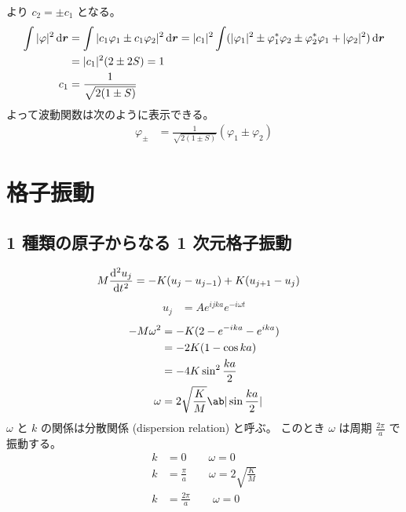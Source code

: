 \documentclass[uplatex,dvipdfmx,a4paper,11pt]{jlreq}
\begin{document}
より $c_2 = \pm c_1$ となる。
\begin{align}
  \int|\varphi|^2\dl{\rr} & = \int|c_1\varphi_1 \pm c_1\varphi_2|^2\dl{\rr} = |c_1|^2\int(|\varphi_1|^2 \pm \varphi_1^*\varphi_2 \pm\varphi_2^*\varphi_1 + |\varphi_2|^2)\dl{\rr} \\
                          & = |c_1|^2(2 \pm 2S) = 1                                                                                                                               \\
  c_1                     & = \frac{1}{\sqrt{2(1 \pm S)}}
\end{align}
よって波動関数は次のように表示できる。
\begin{align}
  \varphi_\pm & = \frac{1}{\sqrt{2(1 \pm S)}}(\varphi_1 \pm \varphi_2)
\end{align}


\section{格子振動}
\subsection{1 種類の原子からなる 1 次元格子振動}
\begin{align}
  M\diff[2]{u_j}{t} & = -K(u_j - u_{j-1}) + K(u_{j+1} - u_j)
\end{align}
\begin{align}
  u_j & = Ae^{ijka}e^{-i\omega t}
\end{align}
\begin{align}
  -M\omega^2 & = -K(2 - e^{-ika} - e^{ika})               \\
             & = -2K(1 - \cos ka)                         \\
             & = -4K\sin^2\frac{ka}{2}                    \\
  \omega     & = 2\sqrt{\frac{K}{M}}\ab|\sin\frac{ka}{2}|
\end{align}
$\omega$ と $k$ の関係は分散関係 (dispersion relation) と呼ぶ。
このとき $\omega$ は周期 $\frac{2\pi}{a}$ で振動する。
\begin{align}
  k & = 0 \qquad \omega = 0                               \\
  k & = \frac{\pi}{a} \qquad \omega = 2\sqrt{\frac{K}{M}} \\
  k & = \frac{2\pi}{a} \qquad \omega = 0
\end{align}
\end{document}
